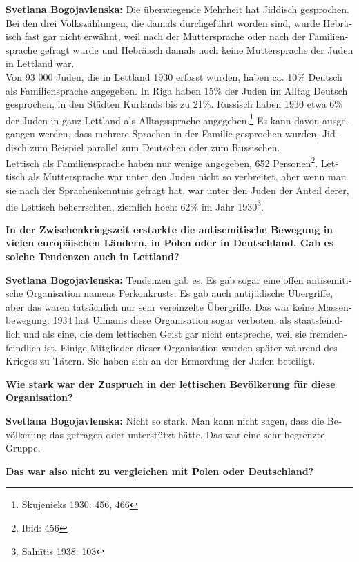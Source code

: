 \begin{otherlanguage}{ngerman}
\textbf{Svetlana Bogojavlenska:} Die überwiegende Mehrheit hat Jiddisch gesprochen. Bei den drei Volkszählungen, die damals durchgeführt worden sind, wurde Hebräisch fast gar nicht erwähnt, weil nach der Muttersprache oder nach der Familiensprache gefragt wurde und Hebräisch damals noch keine Muttersprache der Juden in Lettland war.\\
Von 93 000 Juden, die in Lettland 1930 erfasst wurden, haben ca. 10\% Deutsch als Familiensprache angegeben. In Riga haben 15\% der Juden im Alltag Deutsch gesprochen, in den Städten Kurlands bis zu 21\%. Russisch haben 1930 etwa 6\% der Juden in ganz Lettland als Alltagssprache angegeben.\footnote{Skujenieks 1930: 456, 466}  Es kann davon ausgegangen werden, dass mehrere Sprachen in der Familie gesprochen wurden, Jiddisch zum Beispiel parallel zum Deutschen oder zum Russischen.\\ 
Lettisch als Familiensprache haben nur wenige angegeben, 652 Personen\footnote{Ibid: 456}. Lettisch als Muttersprache war unter den Juden nicht so verbreitet, aber wenn man sie nach der Sprachenkenntnis gefragt hat, war unter den Juden der Anteil derer, die Lettisch beherrschten, ziemlich hoch: 62\% im Jahr 1930\footnote{Salnītis 1938: 103}.

\textbf{In der Zwischenkriegszeit erstarkte die antisemitische Bewegung in vielen europäischen Ländern, in Polen oder in Deutschland. Gab es solche Tendenzen auch in Lettland?}

\textbf{Svetlana Bogojavlenska:} Tendenzen gab es. Es gab sogar eine offen antisemitische Organisation namens Pērkonkrusts. Es gab auch antijüdische Übergriffe, aber das waren tatsächlich nur sehr vereinzelte Übergriffe. Das war keine Massenbewegung. 1934 hat Ulmanis diese Organisation sogar verboten, als staatsfeindlich und als eine, die dem lettischen Geist gar nicht entspreche, weil sie fremdenfeindlich ist. Einige Mitglieder dieser Organisation wurden später während des Krieges zu Tätern. Sie haben sich an der Ermordung der Juden beteiligt.

\textbf{Wie stark war der Zuspruch in der lettischen Bevölkerung für diese Organisation?}

\textbf{Svetlana Bogojavlenska:} Nicht so stark. Man kann nicht sagen, dass die Bevölkerung das getragen oder unterstützt hätte. Das war eine sehr begrenzte Gruppe.
 
\textbf{Das war also nicht zu vergleichen mit Polen oder Deutschland?}


\end{otherlanguage}
